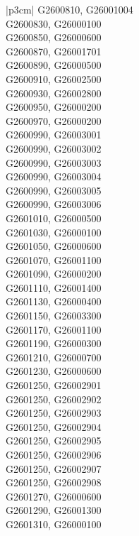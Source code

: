 \begin{customLongTable}{ |p{3cm}| }
G2600810, G26001004 \\ \hline
G2600830, G26000100 \\ \hline
G2600850, G26000600 \\ \hline
G2600870, G26001701 \\ \hline
G2600890, G26000500 \\ \hline
G2600910, G26002500 \\ \hline
G2600930, G26002800 \\ \hline
G2600950, G26000200 \\ \hline
G2600970, G26000200 \\ \hline
G2600990, G26003001 \\ \hline
G2600990, G26003002 \\ \hline
G2600990, G26003003 \\ \hline
G2600990, G26003004 \\ \hline
G2600990, G26003005 \\ \hline
G2600990, G26003006 \\ \hline
G2601010, G26000500 \\ \hline
G2601030, G26000100 \\ \hline
G2601050, G26000600 \\ \hline
G2601070, G26001100 \\ \hline
G2601090, G26000200 \\ \hline
G2601110, G26001400 \\ \hline
G2601130, G26000400 \\ \hline
G2601150, G26003300 \\ \hline
G2601170, G26001100 \\ \hline
G2601190, G26000300 \\ \hline
G2601210, G26000700 \\ \hline
G2601230, G26000600 \\ \hline
G2601250, G26002901 \\ \hline
G2601250, G26002902 \\ \hline
G2601250, G26002903 \\ \hline
G2601250, G26002904 \\ \hline
G2601250, G26002905 \\ \hline
G2601250, G26002906 \\ \hline
G2601250, G26002907 \\ \hline
G2601250, G26002908 \\ \hline
G2601270, G26000600 \\ \hline
G2601290, G26001300 \\ \hline
G2601310, G26000100 \\ \hline

\end{customLongTable}
